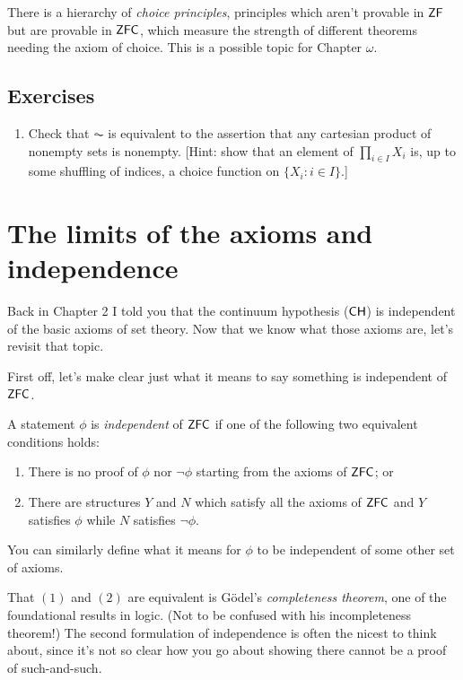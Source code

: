 \documentclass[10pt]{amsart}
\begin{document}
There is a hierarchy of \emph{choice principles}, principles which aren't provable in $\mathsf{ZF}$ but are provable in $\mathsf{ZFC}$, which measure the strength of different theorems needing the axiom of choice. This is a possible topic for Chapter $\omega$.

\subsection*{Exercises}

\begin{enumerate}
\item Check that $\AC$ is equivalent to the assertion that any cartesian product of nonempty sets is nonempty. [Hint: show that an element of $\prod_{i \in I} X_i$ is, up to some shuffling of indices, a choice function on $\{ X_i : i \in I \}$.]
\end{enumerate}

\newpage

\section{The limits of the axioms and independence}

Back in Chapter 2 I told you that the continuum hypothesis ($\mathsf{CH}$) is independent of the basic axioms of set theory. Now that we know what those axioms are, let's revisit that topic.

First off, let's make clear just what it means to say something is independent of $\mathsf{ZFC}$. 

\begin{definition}
A statement $\phi$ is \emph{independent} of $\mathsf{ZFC}$ if one of the following two equivalent conditions holds:
\begin{enumerate}
\item There is no proof of $\phi$ nor $\neg \phi$ starting from the axioms of $\mathsf{ZFC}$; or
\item There are structures $Y$ and $N$ which satisfy all the axioms of $\mathsf{ZFC}$ and $Y$ satisfies $\phi$ while $N$ satisfies $\neg \phi$.
\end{enumerate}
You can similarly define what it means for $\phi$ to be independent of some other set of axioms.
\end{definition}

That $(1)$ and $(2)$ are equivalent is G\"odel's \emph{completeness theorem}, one of the foundational results in logic. (Not to be confused with his incompleteness theorem!) The second formulation of independence is often the nicest to think about, since it's not so clear how you go about showing there cannot be a proof of such-and-such.
\end{document}
